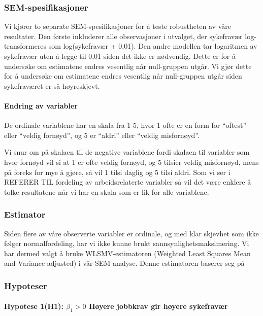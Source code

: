 \documentclass[
  12pt,
  a4paper,
  DIV=11,
  numbers=noendperiod]{scrartcl}
\let\oldparagraph\paragraph
\renewcommand{\paragraph}[1]{\oldparagraph{#1}\mbox{}}
\begin{document}
\subsubsection{SEM-spesifikasjoner}\label{sem-spesifikasjoner}

Vi kjører to separate SEM-spesifikasjoner for å teste robustheten av
våre resultater. Den første inkluderer alle observasjoner i utvalget,
der sykefravær log-transformeres som log(sykefravær + 0,01). Den andre
modellen tar logaritmen av sykefravær uten å legge til 0,01 siden det
ikke er nødvendig. Dette er for å undersøke om estimatene endres
vesentlig når null-gruppen utgår. Vi gjør dette for å undersøke om
estimatene endres vesentlig når null-gruppen utgår siden sykefraværet er
så høyreskjevt.

\paragraph{Endring av variabler}\label{endring-av-variabler}

De ordinale variablene har en skala fra 1-5, hvor 1 ofte er en form for
``oftest'' eller ``veldig fornøyd'', og 5 er ``aldri'' eller ``veldig
misfornøyd''.

Vi snur om på skalaen til de negative variablene fordi skalaen til
variabler som hvor fornøyd vil si at 1 er ofte veldig fornøyd, og 5
tilsier veldig misfornøyd, mens på foreks for mye å gjøre, så vil 1
tilsi daglig og 5 tilsi aldri. Som vi ser i REFERER TIL fordeling av
arbeidsrelaterte variabler så vil det være enklere å tolke resultatene
når vi har en skala som er lik for alle variablene.

\subsubsection{Estimator}\label{estimator}

Siden flere av våre observerte variabler er ordinale, og med klar
skjevhet som ikke følger normalfordeling, har vi ikke kunne brukt
sannsynlighetsmaksimering. Vi har dermed valgt å bruke WLSMV-estimatoren
(Weighted Least Squares Mean and Variance adjusted) i vår SEM-analyse.
Denne estimatoren baserer seg på

\subsubsection{Hypoteser}\label{sec-hypot}

\paragraph{\texorpdfstring{Hypotese 1(H1): \(\beta_1 > 0\) Høyere
jobbkrav gir høyere
sykefravær}{Hypotese 1(H1): \textbackslash beta\_1 \textgreater{} 0 Høyere jobbkrav gir høyere sykefravær}}\label{hypotese-1h1-beta_1-0-huxf8yere-jobbkrav-gir-huxf8yere-sykefravuxe6r}
\end{document}
